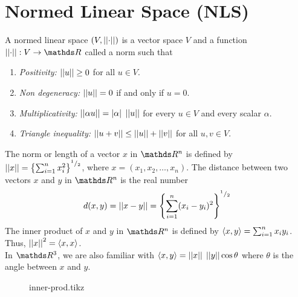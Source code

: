 \documentclass[../main-sheet.tex]{subfiles}
\begin{document}
\section{Normed Linear Space (NLS)}
A normed linear space $ (V,\left\vert\left\vert\cdot\right\vert\right\vert) $ is a vector space $ V $ and a function $ \norm{\cdot}:V\to\R $ called a norm such that
\begin{enumerate}[label=(\roman*)]
    \item \emph{Positivity:} $ \left\vert\left\vert u\right\vert\right\vert\geq 0 $ for all $ u\in V $.
    \item \emph{Non degeneracy:} $ \left\vert\left\vert u\right\vert\right\vert=0 $ if and only if $ u=0 $.
    \item \emph{Multiplicativity:} $ \left\vert\left\vert\alpha u\right\vert\right\vert=\left\vert\alpha\right\vert\;\left\vert\left\vert u\right\vert\right\vert  $ for every $ u\in V $ and every scalar $ \alpha $.
    \item \emph{Triangle inequality:} $ \left\vert\left\vert u+v\right\vert\right\vert\leq \left\vert\left\vert u\right\vert\right\vert+\left\vert\left\vert v\right\vert\right\vert $ for all $ u,v\in V $.
\end{enumerate}
\begin{defn}
    The norm or length of a vector $ x $ in $ \R^n $ is defined by $ \left\vert\left\vert x\right\vert\right\vert=\left\{ \sum_{i=1}^n x_i^2 \right\}^{{}^1/{}_2}  $, where $ x=(x_1,x_2,\dots,x_n) $. The distance between two vectors $ x $ and $ y $ in $ \R^n $ is the real number
    \[d(x,y)=\left\vert\left\vert x-y\right\vert\right\vert=\left\{ \sum_{i=1}^n (x_i-y_i)^2 \right\}^{{}^1/{}_2} \]
    The inner product of $ x $ and $ y $ in $ \R^n $ is defined by $ \left<x,y\right>=\sum_{i=1}^n x_iy_i $. Thus, $ \left\vert\left\vert x\right\vert\right\vert^2=\left<x,x\right> $.\\
    In $ \R^3 $, we are also familiar with $ \left<x,y\right>=\left\vert\left\vert x\right\vert\right\vert\;\left\vert\left\vert y\right\vert\right\vert\cos \theta $ where $ \theta $ is the angle between $ x $ and $ y $.
\end{defn}
\begin{figure}[H]
    \centering
    {inner-prod.tikz}
\end{figure}
\end{document}
